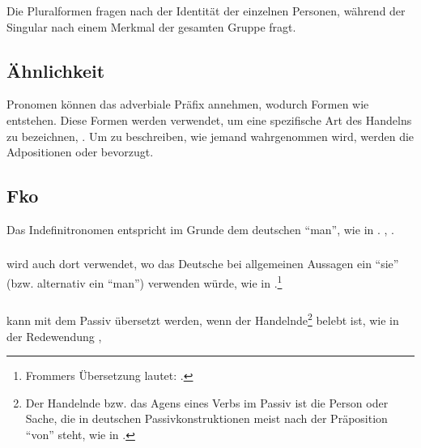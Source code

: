 \noindent Die Pluralformen fragen nach der Identität der einzelnen Personen, während der Singular nach einem Merkmal der gesamten Gruppe fragt.

\subsection{Ähnlichkeit} Pronomen können das adverbiale Präfix  annehmen, wodurch Formen wie   entstehen. Diese Formen werden verwendet, um eine spezifische Art des Handelns zu bezeichnen,  . Um zu beschreiben, wie jemand wahrgenommen wird, werden die Adpositionen  oder  bevorzugt.

\subsection{Fko} Das Indefinitronomen  entspricht im Grunde dem deutschen ``man'', wie in .  ,  .

\subsubsection{}  wird auch dort verwendet, wo das Deutsche bei allgemeinen Aussagen ein ``sie'' (bzw. alternativ ein ``man'') verwenden würde, wie in  .\footnote{Frommers Übersetzung lautet: .}

\subsubsection{}  kann mit dem Passiv übersetzt werden, wenn der Handelnde\footnote{Der Handelnde bzw. das Agens eines Verbs im Passiv ist die Person oder Sache, die in deutschen Passivkonstruktionen meist nach der Präposition ``von'' steht, wie in .} belebt ist, wie in der Redewendung  ,  
\label{syn:prn:fko}


